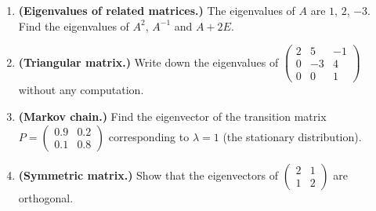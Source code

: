 \begin{enumerate}[label=\arabic*., leftmargin=*]
\item \textbf{(Eigenvalues of related matrices.)} The eigenvalues of $A$ are $1$, $2$, $-3$. Find the eigenvalues of $A^2$, $A^{-1}$ and $A+2E$.
\item \textbf{(Triangular matrix.)} Write down the eigenvalues of $\left(\begin{smallmatrix}2&5&-1\\0&-3&4\\0&0&1\end{smallmatrix}\right)$ without any computation.
\item \textbf{(Markov chain.)} Find the eigenvector of the transition matrix $P=\left(\begin{smallmatrix}0.9&0.2\\0.1&0.8\end{smallmatrix}\right)$ corresponding to $\lambda=1$ (the stationary distribution).
\item \textbf{(Symmetric matrix.)} Show that the eigenvectors of $\left(\begin{smallmatrix}2&1\\1&2\end{smallmatrix}\right)$ are orthogonal.
\end{enumerate}

